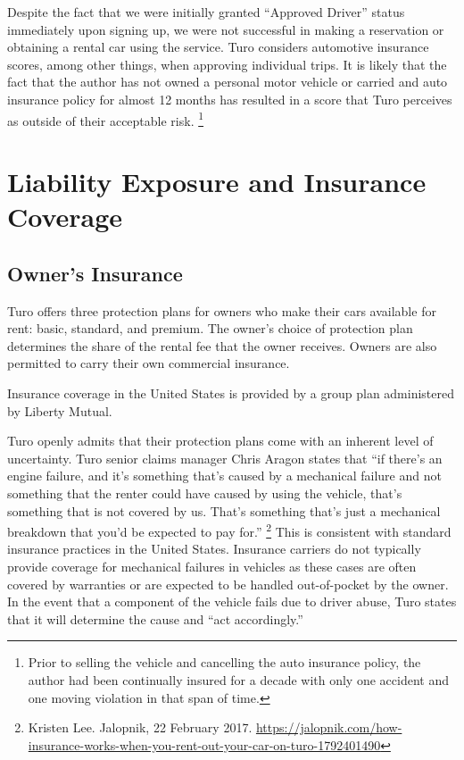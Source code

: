 \documentclass[review,12pt]{elsarticle}
\begin{document}
Despite the fact that we were initially granted ``Approved Driver'' status immediately upon signing up, we were not successful in making a reservation or obtaining a rental car using the service. Turo considers automotive insurance scores, among other things, when approving individual trips. It is likely that the fact that the author has not owned a personal motor vehicle or carried and auto insurance policy for almost 12 months has resulted in a score that Turo perceives as outside of their acceptable risk.
\footnote{Prior to selling the vehicle and cancelling the auto insurance policy, the author had been continually insured for a decade with only one accident and one moving violation in that span of time.
}


\section{Liability Exposure and Insurance Coverage}
\label{S:2}
\subsection{Owner's Insurance}
Turo offers three protection plans for owners who make their cars available for rent: basic, standard, and premium. The owner's choice of protection plan determines the share of the rental fee that the owner receives. Owners are also permitted to carry their own commercial insurance.

Insurance coverage in the United States is provided by a group plan administered by Liberty Mutual.

Turo openly admits that their protection plans come with an inherent level of uncertainty. Turo senior claims manager Chris Aragon states that ``if there's an engine failure, and it's something that's caused by a mechanical failure and not something that the renter could have caused by using the vehicle, that's something that is not covered by us. That's something that's just a mechanical breakdown that you'd be expected to pay for.''
  \footnote{
  Kristen Lee. Jalopnik, 22 February 2017. \url{https://jalopnik.com/how-insurance-works-when-you-rent-out-your-car-on-turo-1792401490}
  }
This is consistent with standard insurance practices in the United States. Insurance carriers do not typically provide coverage for mechanical failures in vehicles as these cases are often covered by warranties or are expected to be handled out-of-pocket by the owner. In the event that a component of the vehicle fails due to driver abuse, Turo states that it will determine the cause and ``act accordingly.''
\end{document}
